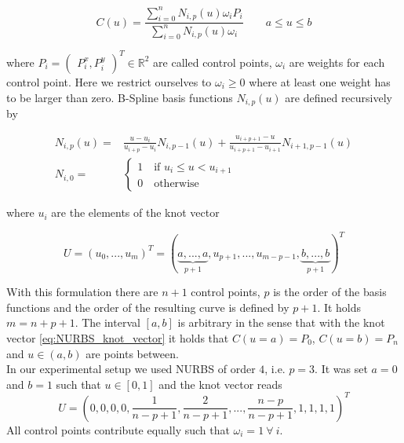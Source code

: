 \documentclass{scrartcl}[12pt, halfparskip]
\numberwithin{equation}{section}
\numberwithin{figure}{section}
\numberwithin{table}{section}
\begin{document}
\begin{equation}
	C(u) = \frac{\sum_{i=0}^{n} N_{i,p}(u) \omega_i P_i }{\sum_{i=0}^{n} N_{i,p}(u) \omega_i} \qquad a \le u \le b
\end{equation}

where $P_i = \begin{pmatrix}
P_i^x, P_i^y \end{pmatrix}^T \in \mathbb{R}^2$ are called control points, $\omega_i$ are weights for each control point. Here we restrict ourselves to $\omega_i \ge 0$ where at least one weight has to be larger than zero.
B-Spline basis functions $N_{i,p}(u)$ are defined recursively by

\begin{align}
	N_{i,p}(u) = & \frac{u - u_i}{u_{i+p} - u_i} N_{i,p-1}(u) + \frac{u_{i+p+1} - u}{u_{i+p+1} - u_{i+1}} N_{i+1,p-1}(u) \label{eq:NURBS_basis_polynomial} \\[1ex]
	N_{i,0} = &
	\begin{cases}
		1 \quad \text{if } u_i \le u < u_{i+1} \\
		0 \quad \text{otherwise}
	\end{cases} \nonumber
\end{align}

where $u_i$ are the elements of the knot vector

\begin{equation}
	U = (u_0,...,u_m)^T =
	(\underbrace{a,...,a}_{p+1},u_{p+1},...,u_{m-p-1},\underbrace{b,...,b}_{p+1})^T
	\label{eq:NURBS_knot_vector}
\end{equation}

With this formulation there are $n+1$ control points, $p$ is the order of the basis functions and the order of the resulting curve is defined by $p+1$. It holds ${m=n+p+1}$. The interval $[a,b]$ is arbitrary in the sense that with the knot vector \cref{eq:NURBS_knot_vector} it holds that $C(u=a)=P_0$, $C(u=b)=P_n$ and $u \in (a,b)$ are points between. \\

In our experimental setup we used NURBS of order $4$, i.e. $p=3$. It was set $a=0$ and $b=1$ such that $u \in [0,1]$ and the knot vector reads
\begin{equation}
	U = (0,0,0,0,\frac{1}{n-p+1},\frac{2}{n-p+1},...,\frac{n-p}{n-p+1},1,1,1,1)^T 
\end{equation}
All control points contribute equally such that $\omega_i=1 \ \forall \ i$. 
\end{document}
